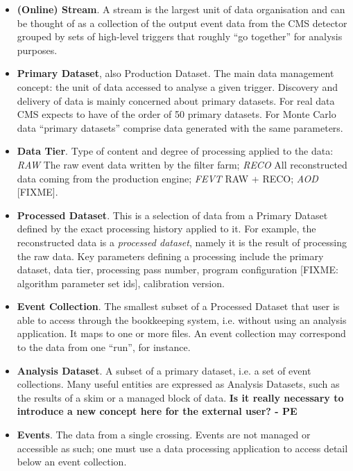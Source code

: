 \documentclass{cmspaper}
\begin{document}
\begin{itemize}
\item {\bf (Online) Stream}.  A stream is the largest unit of data organisation
and can be thought of as a collection of the output event data from the CMS
detector grouped by sets of high-level triggers that roughly ``go together'' 
for analysis purposes. 

\item {\bf Primary Dataset}, also Production Dataset.  The main
data management concept: the unit of data accessed to analyse a given trigger.
Discovery and delivery of data is mainly concerned about primary datasets.
For real data CMS expects to have of the order of 50 primary datasets.  
For Monte Carlo data ``primary datasets'' comprise data generated with the 
same parameters.

\item {\bf Data Tier}. Type of content and degree of processing applied to the
data: {\em RAW} The raw event data written by the filter farm; {\em RECO} All
reconstructed data coming from the production engine; {\em FEVT} RAW + RECO;
{\em AOD} [FIXME].

\item {\bf Processed Dataset}. This is a selection of data from a Primary Dataset
defined by the exact processing history applied to it.  For example, the reconstructed data
is a {\em processed dataset}, namely it is the result of processing the raw data.
Key parameters defining a processing include the primary dataset, data tier,
processing pass number, program configuration [FIXME: algorithm parameter set
ids], calibration version.

\item{\bf Event Collection}. The smallest subset of a Processed Dataset that
user is able to access through the bookkeeping system, i.e. without using an
analysis application.  It maps to one or more files.  An event collection
may correspond to the data from one ``run'', for instance.

\item {\bf Analysis Dataset}.  A subset of a primary dataset, i.e. a set of
event collections.  Many useful entities are expressed as Analysis Datasets, 
such as the results of a skim or a managed block of data. {\bf Is it really
necessary to introduce a new concept here for the external user? - PE}

\item {\bf Events}.  The data from a single crossing.  Events are not managed
or accessible as such; one must use a data processing application to access
detail below an event collection.
\end{itemize}
\end{document}
